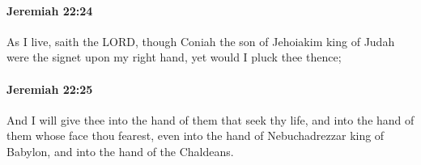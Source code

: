 		\paragraph{Jeremiah 22:24} %
			\label{JEREMIAH-22-24}

			As I live, saith the LORD, though Coniah the son of Jehoiakim king of Judah were the signet upon my right hand, yet would I pluck thee thence;


		\paragraph{Jeremiah 22:25} %
			\label{JEREMIAH-22-25}

			And I will give thee into the hand of them that seek thy life, and into the hand of them whose face thou fearest, even into the hand of Nebuchadrezzar king of Babylon, and into the hand of the Chaldeans.



